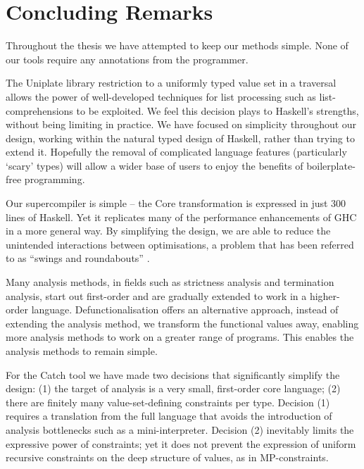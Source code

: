 \section{Concluding Remarks}

Throughout the thesis we have attempted to keep our methods simple. None of our tools require any annotations from the programmer.

The Uniplate library restriction to a uniformly typed value set in a traversal allows the power of well-developed techniques for list processing such as list-comprehensions to be exploited. We feel this decision plays to Haskell's strengths, without being limiting in practice. We have focused on simplicity throughout our design, working within the natural typed design of Haskell, rather than trying to extend it. Hopefully the removal of complicated language features (particularly `scary' types) will allow a wider base of users to enjoy the benefits of boilerplate-free programming.

Our supercompiler is simple -- the Core transformation is expressed in just 300 lines of Haskell. Yet it replicates many of the performance enhancements of GHC in a more general way. By simplifying the design, we are able to reduce the unintended interactions between optimisations, a problem that has been referred to as ``swings and roundabouts'' \cite{marlow:fast_curry}.

Many analysis methods, in fields such as strictness analysis and termination analysis, start out first-order and are gradually extended to work in a higher-order language. Defunctionalisation offers an alternative approach, instead of extending the analysis method, we transform the functional values away, enabling more analysis methods to work on a greater range of programs. This enables the analysis methods to remain simple.

For the Catch tool we have made two decisions that significantly simplify the design: (1) the target of analysis is a very small, first-order core language; (2) there are finitely many value-set-defining constraints per type. Decision (1) requires a translation from the full language that avoids the introduction of analysis bottlenecks such as a mini-interpreter.
Decision (2) inevitably limits the expressive power of constraints; yet it does not prevent the expression of uniform recursive constraints on the deep structure of values, as in MP-constraints.



